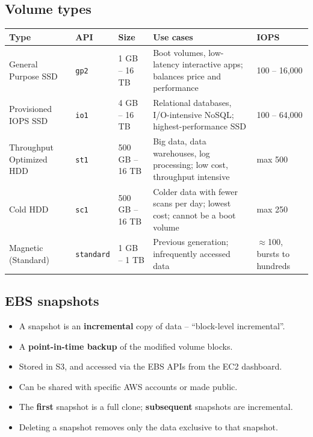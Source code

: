 \documentclass[11pt,a4paper]{article}
\begin{document}
\subsection{Volume types}

\begin{tabularx}{\textwidth}{@{}p{2.7cm}lp{2.1cm}Xp{2.3cm}@{}}
\toprule
\rowcolor{tablehead}\textbf{Type} & \textbf{API} & \textbf{Size} & \textbf{Use cases} &
  \textbf{IOPS} \\
\midrule
General Purpose SSD & \texttt{gp2} & 1 GB -- 16 TB & Boot volumes, low-latency interactive
  apps; balances price and performance & 100 -- 16,000 \\
\addlinespace
Provisioned IOPS SSD & \texttt{io1} & 4 GB -- 16 TB & Relational databases, I/O-intensive
  NoSQL; highest-performance SSD & 100 -- 64,000 \\
\addlinespace
Throughput Optimized HDD & \texttt{st1} & 500 GB -- 16 TB & Big data, data warehouses, log
  processing; low cost, throughput intensive & max 500 \\
\addlinespace
Cold HDD & \texttt{sc1} & 500 GB -- 16 TB & Colder data with fewer scans per day; lowest cost;
  cannot be a boot volume & max 250 \\
\addlinespace
Magnetic (Standard) & \texttt{standard} & 1 GB -- 1 TB & Previous generation; infrequently
  accessed data & $\approx$100, bursts to hundreds \\
\bottomrule
\end{tabularx}

\subsection{EBS snapshots}

\begin{itemize}\itemsep2pt
  \item A snapshot is an \textbf{incremental} copy of data -- ``block-level incremental''.
  \item A \textbf{point-in-time backup} of the modified volume blocks.
  \item Stored in S3, and accessed via the EBS APIs from the EC2 dashboard.
  \item Can be shared with specific AWS accounts or made public.
  \item The \textbf{first} snapshot is a full clone; \textbf{subsequent} snapshots are
        incremental.
  \item Deleting a snapshot removes only the data exclusive to that snapshot.
\end{itemize}
\end{document}
